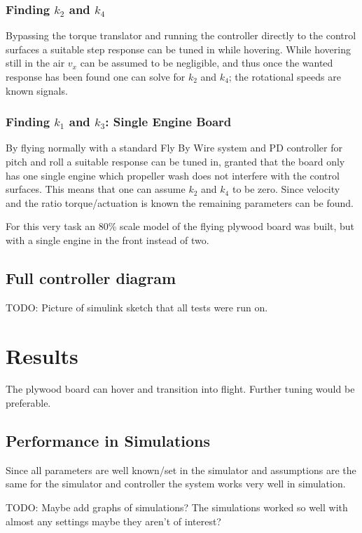 \documentclass{article}
\begin{document}
\subsubsection{Finding $k_2$ and $k_4$}
Bypassing the torque translator and running the controller directly to the control surfaces a suitable step response can be tuned in while hovering.
While hovering still in the air $v_x$ can be assumed to be negligible, and thus once the wanted response has been found one can solve for $k_2$ and $k_4$; the rotational speeds are known signals.

\subsubsection{Finding $k_1$ and $k_3$: Single Engine Board}
By flying normally with a standard Fly By Wire system and PD controller for pitch and roll a suitable response can be tuned in, granted that the board only has one single engine which propeller wash does not interfere with the control surfaces.
This means that one can assume $k_2$ and $k_4$ to be zero.
Since velocity and the ratio torque/actuation is known the remaining parameters can be found.

For this very task an 80\% scale model of the flying plywood board was built, but with a single engine in the front instead of two.

\subsection{Full controller diagram}
TODO: Picture of simulink sketch that all tests were run on.

\section{Results}

The plywood board can hover and transition into flight.
Further tuning would be preferable.

\subsection{Performance in Simulations}
Since all parameters are well known/set in the simulator and assumptions are the same for the simulator and controller the system works very well in simulation.


TODO: Maybe add graphs of simulations?
The simulations worked so well with almost any settings maybe they aren't of interest?
\end{document}
